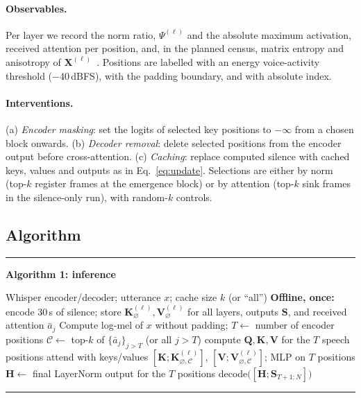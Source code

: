 \paragraph{Observables.} Per layer we record the norm ratio, $\Psi^{(\ell)}$ and the absolute maximum activation, received attention per position, and, in the planned census, matrix entropy and anisotropy of $\mathbf{X}^{(\ell)}$~\cite{queipo2026valleys}. Positions are labelled with an energy voice-activity threshold ($-40$\,dBFS), with the padding boundary, and with absolute index.

\paragraph{Interventions.} (a) \emph{Encoder masking}: set the logits of selected key positions to $-\infty$ from a chosen block onwards. (b) \emph{Decoder removal}: delete selected positions from the encoder output before cross-attention. (c) \emph{Caching}: replace computed silence with cached keys, values and outputs as in Eq.~\eqref{eq:update}. Selections are either by norm (top-$k$ register frames at the emergence block) or by attention (top-$k$ sink frames in the silence-only run), with random-$k$ controls.

\subsection{Algorithm}

\begin{center}
\begin{minipage}{0.96\columnwidth}
\hrule\vspace{0.4em}
\textbf{Algorithm 1: \method{} inference}\vspace{0.25em}
\begin{algorithmic}[1]
\Require Whisper encoder/decoder; utterance $x$; cache size $k$ (or ``all'')
\State \textbf{Offline, once:} encode 30\,s of silence; store $\mathbf{K}^{(\ell)}_{\varnothing},\mathbf{V}^{(\ell)}_{\varnothing}$ for all layers, outputs $\mathbf{S}$, and received attention $\bar a_j$
\State Compute log-mel of $x$ without padding; $T\gets$ number of encoder positions
\State $\mathcal{C}\gets$ top-$k$ of $\{\bar a_j\}_{j>T}$ (or all $j>T$)
    \State compute $\mathbf{Q},\mathbf{K},\mathbf{V}$ for the $T$ speech positions
    \State attend with keys/values $[\mathbf{K};\mathbf{K}^{(\ell)}_{\varnothing,\mathcal{C}}]$, $[\mathbf{V};\mathbf{V}^{(\ell)}_{\varnothing,\mathcal{C}}]$; MLP on $T$ positions
\EndFor
\State $\mathbf{H}\gets$ final LayerNorm output for the $T$ positions
\State \Return decode$\big([\mathbf{H};\mathbf{S}_{T+1:N}]\big)$
\end{algorithmic}
\vspace{0.3em}\hrule
\end{minipage}
\end{center}

